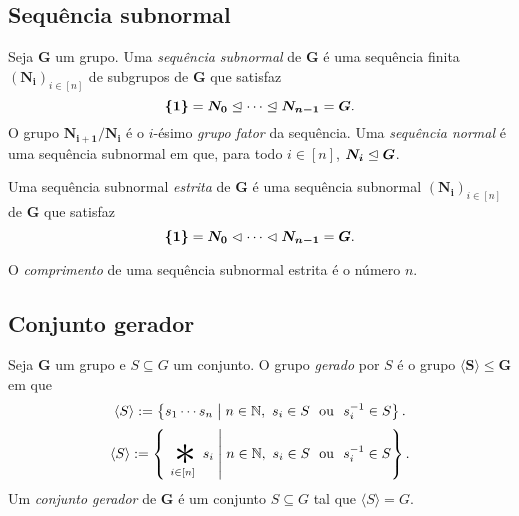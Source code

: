 \subsection{Sequência subnormal}

\begin{definition}
Seja $\bm G$ um grupo. Uma \emph{sequência subnormal} de $\bm G$ é uma sequência finita $(\bm{N_i})_{i \in [n]}$ de subgrupos de $\bm G$ que satisfaz
	\begin{equation*}
	\bm{\{1\}} = \bm{N_0} \mathrel{\unlhd} \cdots \mathrel{\unlhd} \bm{N_{n-1}} = \bm G.
	\end{equation*}
O grupo $\bm{N_{i+1}/N_i}$ é o $i$-ésimo \emph{grupo fator} da sequência.
Uma \emph{sequência normal} é uma sequência subnormal em que, para todo $i \in [n]$, $\bm{N_i} \mathrel{\unlhd} \bm G$.

Uma sequência subnormal \emph{estrita} de $\bm G$ é uma sequência subnormal $(\bm{N_i})_{i \in [n]}$ de $\bm G$ que satisfaz
	\begin{equation*}
	\bm{\{1\}} = \bm{N_0} \mathrel{\lhd} \cdots \mathrel{\lhd} \bm{N_{n-1}} = \bm G.
	\end{equation*}

O \emph{comprimento} de uma sequência subnormal estrita é o número $n$.
\end{definition}



\subsection{Conjunto gerador}

\begin{definition}
Seja $\bm G$ um grupo e $S \subseteq G$ um conjunto. O grupo \emph{gerado} por $S$ é o grupo $\bm{\langle S \rangle} \leq \bm G$ em que
	\begin{equation*}
	\langle S \rangle := \left\{{s_1 \cdots s_n}\;\middle\vert\;{n \in \mathbb{N},\ s_i \in S \text{\ \ ou\ \ } s_i^{-1} \in S}\right\}.
	\end{equation*}
	\begin{equation*}
	\langle S \rangle := \set{\bigopb_{i \in [n]} s_i}{n \in \N,\ s_i \in S \text{\ \ ou\ \ } s_i\inv \in S}.
	\end{equation*}
\noindent
Um \emph{conjunto gerador} de $\bm G$ é um conjunto $S \subseteq G$ tal que $\langle S \rangle = G$.
\end{definition}









